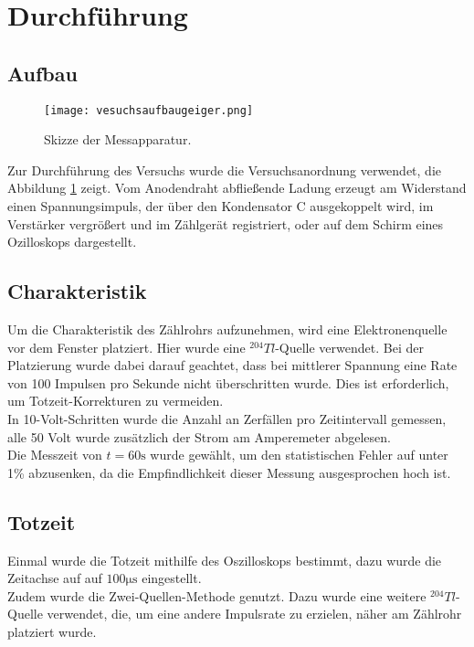 \section{Durchführung}
\label{sec:Durchführung}

\subsection{Aufbau}
\begin{figure}
 \centering
 \texttt{[image: vesuchsaufbaugeiger.png]}
 \caption{Skizze der Messapparatur.}
 \label{fig:aufbauversuch}
\end{figure}

\noindent Zur Durchführung des Versuchs wurde die Versuchsanordnung verwendet,
die Abbildung \ref{fig:aufbauversuch} zeigt. Vom Anodendraht abfließende Ladung
erzeugt am Widerstand einen Spannungsimpuls, der über den Kondensator C ausgekoppelt wird,
im Verstärker vergrößert und im Zählgerät registriert, oder auf dem Schirm
eines Ozilloskops dargestellt.\\

\subsection{Charakteristik}
Um die Charakteristik des Zählrohrs aufzunehmen, wird eine Elektronenquelle vor dem
Fenster platziert. Hier wurde eine $^204Tl$-Quelle verwendet. Bei der Platzierung
wurde dabei darauf geachtet, dass bei mittlerer Spannung eine Rate von
100 Impulsen pro Sekunde nicht überschritten wurde. Dies ist erforderlich,
um Totzeit-Korrekturen zu vermeiden. \\
In 10-Volt-Schritten wurde die Anzahl an Zerfällen pro Zeitintervall gemessen, alle 
50 Volt wurde zusätzlich der Strom am Amperemeter abgelesen.\\
Die Messzeit von $t = 60\si{\s}$ wurde gewählt, um den statistischen Fehler
auf unter 1\% abzusenken, da die Empfindlichkeit dieser Messung ausgesprochen
hoch ist. 

\subsection{Totzeit}
Einmal wurde die Totzeit mithilfe des Oszilloskops bestimmt, dazu wurde 
die Zeitachse auf auf $100 \si{\micro\s}$ eingestellt.\\
Zudem wurde die Zwei-Quellen-Methode genutzt. Dazu wurde eine weitere
$^204 Tl$-Quelle verwendet, die, um eine andere Impulsrate zu erzielen,
näher am Zählrohr platziert wurde. 
